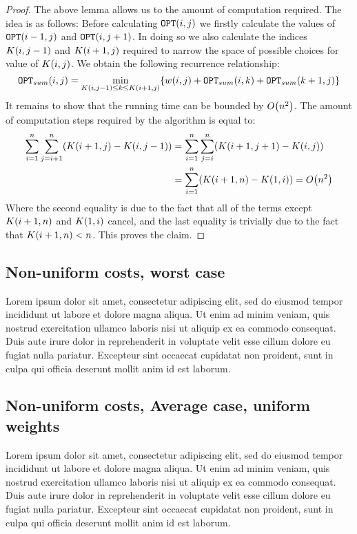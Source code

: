 \begin{theorem}
\begin{proof}
The above lemma allows us to the amount of computation required. The idea is as follows: Before calculating $\texttt{OPT}\mathopen{}\left( i,j \right)$ we firstly calculate the values of $\texttt{OPT}\mathopen{}\left( i -1,j \right)$ and $\texttt{OPT}\mathopen{}\left( i,j + 1 \right)$. In doing so we also calculate the indices $K\mathopen{}\left( i,j-1 \right)$ and $K\mathopen{}\left( i +1,j \right)$ required to narrow the space of possible choices for value of $K\mathopen{}\left( i,j \right)$. We obtain the following recurrence relationship:
$$
\texttt{OPT}_{sum}\mathopen{}\left( i,j \right) = \min_{K\mathopen{}\left( i,j-1 \right)\leq k\leq K\mathopen{}\left( i +1,j \right)}\mathopen{}\left\{ w\mathopen{}\left( i,j \right)+\texttt{OPT}_{sum}\mathopen{}\left( i, k \right)+ \texttt{OPT}_{sum}\mathopen{}\left( k+1, j \right) \right\}
$$
It remains to show that the running time can be bounded by $O\mathopen{}\left( n^2 \right)$. The amount of computation steps required by the algorithm is equal to:
\begin{align*}
\sum_{i=1}^n\sum_{j=i+1}^n\mathopen{}\left( K\mathopen{}\left( i + 1, j \right) - K\mathopen{}\left( i,j - 1 \right) \right) &= \sum_{i=1}^n\sum_{j=i}^n\mathopen{}\left( K\mathopen{}\left( i + 1,j+1 \right) - K\mathopen{}\left( i,j \right) \right)
\\
&=\sum_{i=1}^n\mathopen{}\left( K\mathopen{}\left( i + 1,n \right)-K\mathopen{}\left( 1,i \right) \right) = O\mathopen{}\left( n^2 \right)
\end{align*}
Where the second equality is due to the fact that all of the terms except $K\mathopen{}\left( i + 1,n \right)$ and $K\mathopen{}\left( 1,i \right)$ cancel, and the last equality is trivially due to the fact that $K\mathopen{}\left( i + 1,n \right) < n$. This proves the claim.
    \end{proof}
\end{theorem}
\subsection{Non-uniform costs, worst case}
Lorem ipsum dolor sit amet, consectetur adipiscing elit, sed do eiusmod tempor incididunt ut labore et dolore magna aliqua. Ut enim ad minim veniam, quis nostrud exercitation ullamco laboris nisi ut aliquip ex ea commodo consequat. Duis aute irure dolor in reprehenderit in voluptate velit esse cillum dolore eu fugiat nulla pariatur. Excepteur sint occaecat cupidatat non proident, sunt in culpa qui officia deserunt mollit anim id est laborum.
\subsection{Non-uniform costs, Average case, uniform weights}
Lorem ipsum dolor sit amet, consectetur adipiscing elit, sed do eiusmod tempor incididunt ut labore et dolore magna aliqua. Ut enim ad minim veniam, quis nostrud exercitation ullamco laboris nisi ut aliquip ex ea commodo consequat. Duis aute irure dolor in reprehenderit in voluptate velit esse cillum dolore eu fugiat nulla pariatur. Excepteur sint occaecat cupidatat non proident, sunt in culpa qui officia deserunt mollit anim id est laborum.
